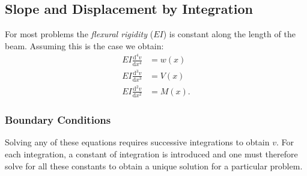 \subsection{Slope and Displacement by Integration}
For most problems the \textit{flexural rigidity} ($EI$) is constant along the length of the beam.
Assuming this is the case we obtain:
\begin{align*}
  EI \frac{\mathrm{d}^{4}v}{\mathrm{d}x^{4}}  &= w(x) \\
  EI \frac{\mathrm{d}^3v}{\mathrm{d}x^3} &= V(x) \\
  EI \frac{\mathrm{d}^2 v}{\mathrm{d}x^2}  &= M(x)
.\end{align*}


\subsubsection{Boundary Conditions}
Solving any of these equations requires successive integrations to obtain $v$.
For each integration, a constant of integration is introduced and one must therefore solve for all these constants to obtain a unique solution for a particular problem.

